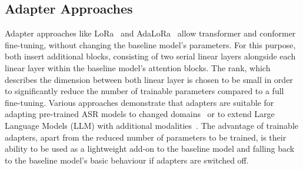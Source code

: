 \subsection{Adapter Approaches}
Adapter approaches like LoRa~\cite{adapt_lora_2022} and AdaLoRa~\cite{adapt_adalora_2023} allow transformer and conformer fine-tuning, without changing the baseline model’s parameters. For this purpose, both insert additional blocks, consisting of two serial linear layers alongside each linear layer within the baseline model’s attention blocks. The rank, which describes the dimension between both linear layer is chosen to be small in order to significantly reduce the number of trainable parameters compared to a full fine-tuning. 
Various approaches demonstrate that adapters are suitable for adapting pre-trained ASR models to changed domains~\cite{adapt_whisperChildSp_2024, adapt_SURE_2023, adapt_peft_ser_2023, adapt_distilWh_2024, adapt_resTransf_2024, AVSR_AVFormer} or to extend Large Language Models (LLM) with additional modalities~\cite{mllm_oct_2024, mllm_tunLN_2024}. The advantage of trainable adapters, apart from the reduced number of parameters to be trained, is their ability to be used as a lightweight add-on to the baseline model and falling back to the baseline model's basic behaviour if adapters are switched off.

